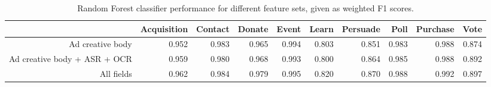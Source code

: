 \begin{table}[ht]
\centering
\begin{tabular}{rrrrrrrrrr}
  \hline
 & Acquisition & Contact & Donate & Event & Learn & Persuade & Poll & Purchase & Vote \\ 
  \hline
Ad creative body & 0.952 & 0.983 & 0.965 & 0.994 & 0.803 & 0.851 & 0.983 & 0.988 & 0.874 \\ 
  Ad creative body + ASR + OCR & 0.959 & 0.980 & 0.968 & 0.993 & 0.800 & 0.864 & 0.985 & 0.988 & 0.892 \\ 
  All fields & 0.962 & 0.984 & 0.979 & 0.995 & 0.820 & 0.870 & 0.988 & 0.992 & 0.897 \\ 
   \hline
\end{tabular}
\caption{Random Forest classifier performance for different feature sets, given as weighted F1 scores.} 
\label{model_performance_feature_comparison}
\end{table}
